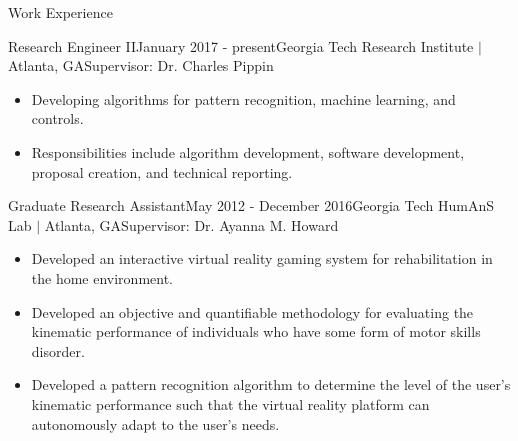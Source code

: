 \documentclass{resume} %
\newcommand{\sectionspace}{\vspace{3mm}}
\begin{document}

\sectionspace
\begin{rSection}{Work Experience}

\begin{rSubsection}{Research Engineer II}{January 2017 - present}{Georgia Tech Research Institute $\vert$ Atlanta, GA}{Supervisor: Dr. Charles Pippin}

\item
\begin{itemize}
\item Developing algorithms for pattern recognition, machine learning, and
  controls.

\item Responsibilities include algorithm development, software development,
  proposal creation, and technical reporting.

\end{itemize}

\end{rSubsection}


\begin{rSubsection}{Graduate Research Assistant}{May 2012 - December 2016}{Georgia Tech HumAnS Lab $\vert$ Atlanta, GA}{Supervisor: Dr. Ayanna M. Howard}

\item
\begin{itemize}
\item Developed an interactive virtual reality gaming system for rehabilitation
  in the home environment.

\item Developed an objective and quantifiable methodology for evaluating the
  kinematic performance of individuals who have some form of motor skills
  disorder.

\item Developed a pattern recognition algorithm to determine the level of the
  user's kinematic performance such that the virtual reality platform can
  autonomously adapt to the user's needs.

\end{itemize}

\end{rSubsection}


\end{rSection}
\end{document}
